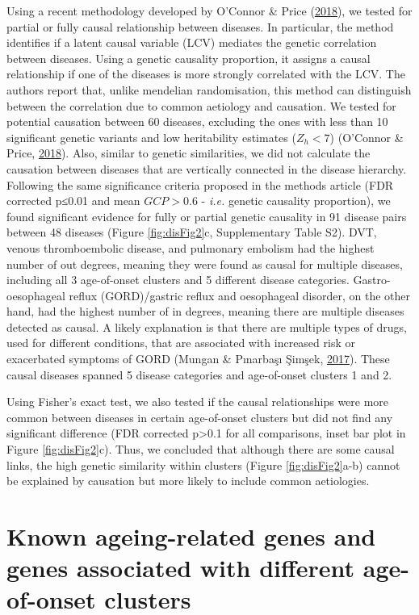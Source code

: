 \documentclass[12pt,twoside]{unicam}
\begin{document}
Using a recent methodology developed by O'Connor \& Price (\protect\hyperlink{ref-OConnor2018}{2018}), we tested for partial or fully causal relationship between diseases. In particular, the method identifies if a latent causal variable (LCV) mediates the genetic correlation between diseases. Using a genetic causality proportion, it assigns a causal relationship if one of the diseases is more strongly correlated with the LCV. The authors report that, unlike mendelian randomisation, this method can distinguish between the correlation due to common aetiology and causation. We tested for potential causation between 60 diseases, excluding the ones with less than 10 significant genetic variants and low heritability estimates (\(Z_h<7\)) (O'Connor \& Price, \protect\hyperlink{ref-OConnor2018}{2018}). Also, similar to genetic similarities, we did not calculate the causation between diseases that are vertically connected in the disease hierarchy. Following the same significance criteria proposed in the methods article (FDR corrected p≤0.01 and mean \(GCP>0.6\) - \emph{i.e.} genetic causality proportion), we found significant evidence for fully or partial genetic causality in 91 disease pairs between 48 diseases (Figure \ref{fig:disFig2}c, Supplementary Table S2). DVT, venous thromboembolic disease, and pulmonary embolism had the highest number of out degrees, meaning they were found as causal for multiple diseases, including all 3 age-of-onset clusters and 5 different disease categories. Gastro-oesophageal reflux (GORD)/gastric reflux and oesophageal disorder, on the other hand, had the highest number of in degrees, meaning there are multiple diseases detected as causal. A likely explanation is that there are multiple types of drugs, used for different conditions, that are associated with increased risk or exacerbated symptoms of GORD (Mungan \& Pınarbaşı Şimşek, \protect\hyperlink{ref-Mungan2017}{2017}). These causal diseases spanned 5 disease categories and age-of-onset clusters 1 and 2.

Using Fisher's exact test, we also tested if the causal relationships were more common between diseases in certain age-of-onset clusters but did not find any significant difference (FDR corrected p\textgreater0.1 for all comparisons, inset bar plot in Figure \ref{fig:disFig2}c). Thus, we concluded that although there are some causal links, the high genetic similarity within clusters (Figure \ref{fig:disFig2}a-b) cannot be explained by causation but more likely to include common aetiologies.

\hypertarget{known-ageing-related-genes-and-genes-associated-with-different-age-of-onset-clusters}{%
\section{Known ageing-related genes and genes associated with different age-of-onset clusters}\label{known-ageing-related-genes-and-genes-associated-with-different-age-of-onset-clusters}}
\end{document}
